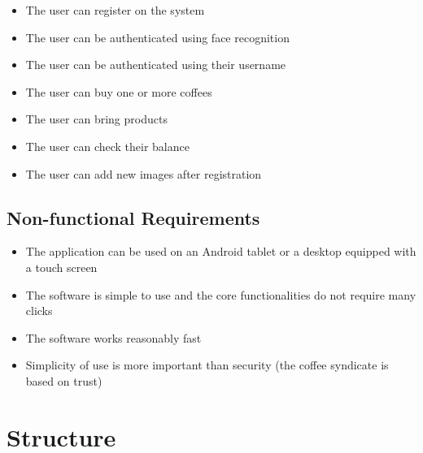 \documentclass[11pt]{article}
\begin{document}
\begin{itemize}
\item{The user can register on the system}
\item{The user can be authenticated using face recognition}
\item{The user can be authenticated using their username}  
\item{The user can buy one or more coffees}
\item{The user can bring products}
\item{The user can check their balance}
\item{The user can add new images after registration}
\end{itemize}  

\subsection{Non-functional Requirements}

\begin{itemize}
\item{The application can be used on an Android tablet or a desktop equipped with a touch screen}
\item{The software is simple to use and the core functionalities do not require many clicks}
\item{The software works reasonably fast} 
\item{Simplicity of use is more important than security (the coffee syndicate is based on trust)}
\end{itemize}

\section{Structure}
\end{document}
